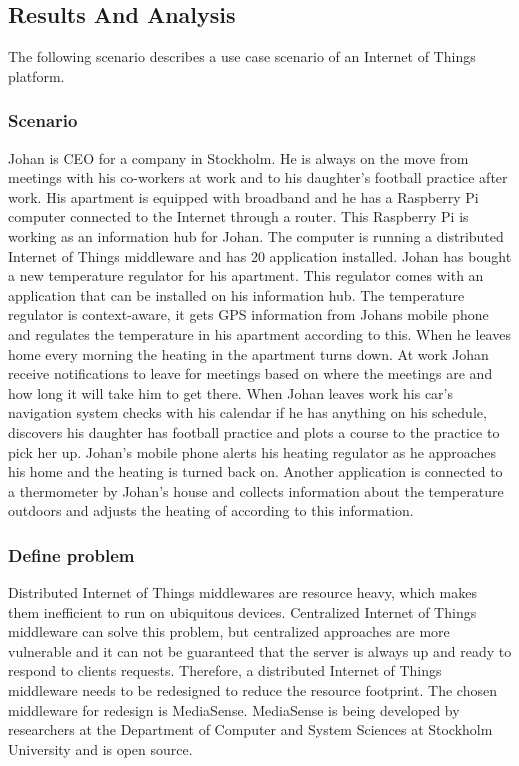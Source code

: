 \subsection{Results And Analysis}
The following scenario describes a use case scenario of an Internet of Things platform.

\subsubsection{Scenario}
Johan is CEO for a company in Stockholm. He is always on the move from meetings with his co-workers at work and to his daughter's football practice after work. His apartment is equipped with broadband and he has a Raspberry Pi computer connected to the Internet through a router. This Raspberry Pi is working as an information hub for Johan. The computer is running a distributed Internet of Things middleware and has 20 application installed. Johan has bought a new temperature regulator for his apartment. This regulator comes with an application that can be installed on his information hub. The temperature regulator is context-aware, it gets GPS information from Johans mobile phone and regulates the temperature in his apartment according to this. When he leaves home every morning the heating in the apartment turns down. At work Johan receive notifications to leave for meetings based on where the meetings are and how long it will take him to get there. When Johan leaves work his car's navigation system checks with his calendar if he has anything on his schedule, discovers his daughter has football practice and plots a course to the practice to pick her up. Johan's mobile phone alerts his heating regulator as he approaches his home and the heating is turned back on. Another application is connected to a thermometer by Johan's house and collects information about the temperature outdoors and adjusts the heating of according to this information.

\subsubsection{Define problem}
Distributed Internet of Things middlewares are resource heavy, which makes them inefficient to run on ubiquitous devices. Centralized Internet of Things middleware can solve this problem, but centralized approaches are more vulnerable and it can not be guaranteed that the server is always up and ready to respond to clients requests. Therefore, a distributed Internet of Things middleware needs to be redesigned to reduce the resource footprint. The chosen middleware for redesign is MediaSense. MediaSense is being developed by researchers at the Department of Computer and System Sciences at Stockholm University and is open source. 

